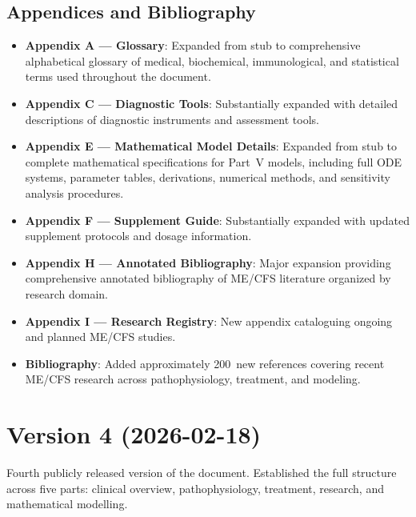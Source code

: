 \subsection*{Appendices and Bibliography}

\begin{itemize}

  \item \textbf{Appendix A --- Glossary}: Expanded from stub to comprehensive
    alphabetical glossary of medical, biochemical, immunological, and
    statistical terms used throughout the document.

  \item \textbf{Appendix C --- Diagnostic Tools}: Substantially expanded with
    detailed descriptions of diagnostic instruments and assessment tools.

  \item \textbf{Appendix E --- Mathematical Model Details}: Expanded from stub
    to complete mathematical specifications for Part~V models, including full
    ODE systems, parameter tables, derivations, numerical methods, and
    sensitivity analysis procedures.

  \item \textbf{Appendix F --- Supplement Guide}: Substantially expanded with
    updated supplement protocols and dosage information.

  \item \textbf{Appendix H --- Annotated Bibliography}: Major expansion providing
    comprehensive annotated bibliography of ME/CFS literature organized by
    research domain.

  \item \textbf{Appendix I --- Research Registry}: New appendix cataloguing
    ongoing and planned ME/CFS studies.

  \item \textbf{Bibliography}: Added approximately 200~new references covering
    recent ME/CFS research across pathophysiology, treatment, and modeling.

\end{itemize}


\section*{Version 4 (2026-02-18)}

Fourth publicly released version of the document. Established the full structure
across five parts: clinical overview, pathophysiology, treatment, research, and
mathematical modelling.


